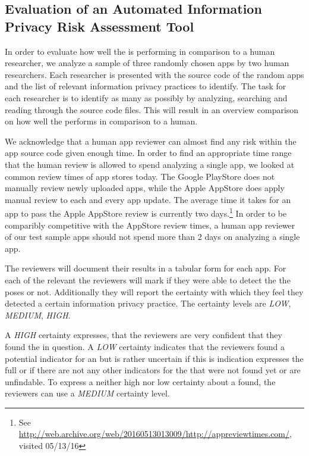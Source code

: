 






\subsection{Evaluation of an Automated Information Privacy Risk Assessment Tool}

In order to evaluate how well the \aiprat is performing in comparison to a human researcher, we analyze a sample of three randomly chosen apps by two human researchers.
Each researcher is presented with the source code of the random apps and the list of relevant information privacy practices to identify.
The task for each researcher is to identify as many \ipp as possibly by analyzing, searching and reading through the source code files. 
This will result in an overview comparison on how well the \aiprat performs in comparison to a human.

We acknowledge that a human app reviewer can almost find any \ipp risk within the app source code given enough time.
In order to find an appropriate time range that the human review is allowed to spend analyzing a single app, we looked at common review times of app stores today.
The Google PlayStore does not manually review newly uploaded apps, while the Apple AppStore does apply manual review to each and every app update.
The average time it takes for an app to pass the Apple AppStore review  is currently two days.\footnote{See \url{http://web.archive.org/web/20160513013009/http://appreviewtimes.com/}, visited 05/13/16}
In order to be comparibly competitive with the AppStore review times, a human app reviewer of our test sample apps should not spend more than 2 days on analyzing a single app.

The reviewers will document their results in a tabular form for each app.
For each of the relevant \ipp the reviewers will mark if they were able to detect the \ipr the \ipp poses or not.
Additionally they will report the certainty with which they feel they detected a certain information privacy practice.
The certainty levels are \textit{LOW}, \textit{MEDIUM}, \textit{HIGH}.

A \textit{HIGH} certainty expresses, that the reviewers are very confident that they found the \ipp in question.
A \textit{LOW} certainty indicates that the reviewers found a potential indicator for an \ipp but is rather uncertain if this is indication expresses the full \ipp or if there are not any other indicators for the \ipp that were not found yet or are unfindable.
To express a neither high nor low certainty about a \ipp found, the reviewers can use a \textit{MEDIUM} certainty level.